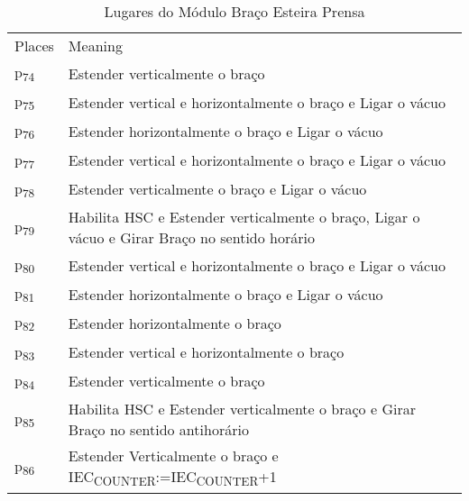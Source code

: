 \begin{table}[htbp]
\caption{Lugares do Módulo Braço Esteira Prensa}
\centering
\begin{tabular}{ll}
Places & Meaning\\
p\textsubscript{74} & Estender verticalmente o braço\\
p\textsubscript{75} & Estender vertical e horizontalmente o braço e Ligar o vácuo\\
p\textsubscript{76} & Estender horizontalmente o braço e Ligar o vácuo\\
p\textsubscript{77} & Estender vertical e horizontalmente o braço e Ligar o vácuo\\
p\textsubscript{78} & Estender verticalmente o braço e Ligar o vácuo\\
p\textsubscript{79} & Habilita HSC e Estender verticalmente o braço, Ligar o vácuo e Girar Braço no sentido horário\\
p\textsubscript{80} & Estender vertical e horizontalmente o braço e Ligar o vácuo\\
p\textsubscript{81} & Estender horizontalmente o braço e Ligar o vácuo\\
p\textsubscript{82} & Estender horizontalmente o braço\\
p\textsubscript{83} & Estender vertical e horizontalmente o braço\\
p\textsubscript{84} & Estender verticalmente o braço\\
p\textsubscript{85} & Habilita HSC e Estender verticalmente o braço e Girar Braço no sentido antihorário\\
p\textsubscript{86} & Estender Verticalmente o braço e IEC\textsubscript{COUNTER}:=IEC\textsubscript{COUNTER}+1\\
\end{tabular}
\end{table}

